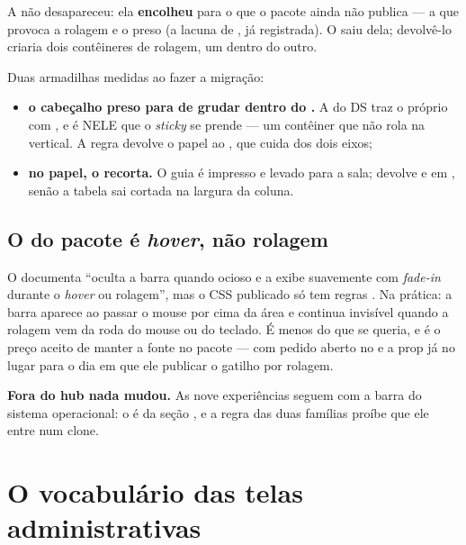 A  não desapareceu: ela \textbf{encolheu} para o que o pacote
ainda não publica --- a  que provoca a rolagem e o 
preso (a lacuna de , já registrada). O  saiu dela;
devolvê-lo criaria dois contêineres de rolagem, um dentro do outro.

Duas armadilhas medidas ao fazer a migração:

\begin{itemize}
  \item \textbf{o cabeçalho preso para de grudar dentro do .} A
     do DS traz o próprio  com
    , e é NELE que o  \emph{sticky} se prende ---
    um contêiner que não rola na vertical. A regra
     devolve
    o papel ao , que cuida dos dois eixos;
  \item \textbf{no papel, o  recorta.} O guia é impresso e levado
    para a sala;  devolve  e
     em , senão a tabela sai cortada na
    largura da coluna.
\end{itemize}

\subsection{O  do pacote é \emph{hover}, não rolagem}

O  documenta \enquote{oculta a barra quando ocioso e a
exibe suavemente com \emph{fade-in} durante o \emph{hover} ou rolagem}, mas o
CSS publicado só tem regras . Na prática: a barra aparece ao passar o
mouse por cima da área e continua invisível quando a rolagem vem da roda do mouse
ou do teclado. É menos do que se queria, e é o preço aceito de manter a fonte no
pacote --- com pedido aberto no  e a prop já no lugar para
o dia em que ele publicar o gatilho por rolagem.

\textbf{Fora do hub nada mudou.} As nove experiências seguem com a barra do
sistema operacional: o  é da seção , e a regra das duas
famílias proíbe que ele entre num clone.

\section{O vocabulário das telas administrativas}

